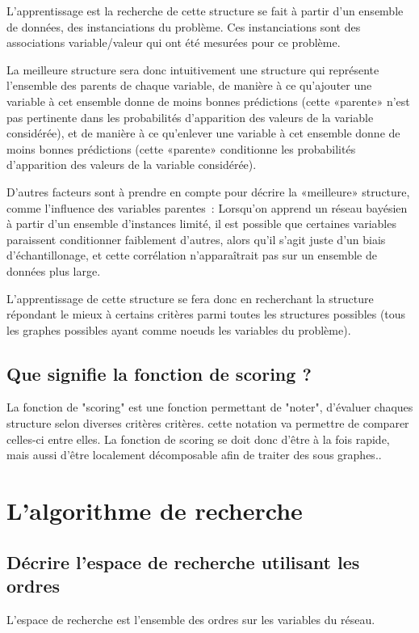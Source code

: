 \documentclass[french,a4paper]{article}
\begin{document}
L'apprentissage est la recherche de cette structure se fait à partir
d'un ensemble de données, des instanciations du problème. Ces
instanciations sont des associations variable/valeur qui ont été
mesurées pour ce problème.

La meilleure structure sera donc intuitivement une structure qui
représente l'ensemble des parents de chaque variable, de manière à ce
qu'ajouter une variable à cet ensemble donne de moins bonnes
prédictions (cette «parente» n'est pas pertinente dans les
probabilités d'apparition des valeurs de la variable considérée), et
de manière à ce qu'enlever une variable à cet ensemble donne de moins
bonnes prédictions (cette «parente» conditionne les probabilités
d'apparition des valeurs de la variable considérée).

D'autres facteurs sont à prendre en compte pour décrire la «meilleure»
structure, comme l'influence des variables parentes~: Lorsqu'on
apprend un réseau bayésien à partir d'un ensemble d'instances limité,
il est possible que certaines variables paraissent conditionner
faiblement d'autres, alors qu'il s'agit juste d'un biais
d'échantillonage, et cette corrélation n'apparaîtrait pas sur un
ensemble de données plus large.

L'apprentissage de cette structure se fera donc en recherchant la
structure répondant le mieux à certains critères parmi toutes les
structures possibles (tous les graphes possibles ayant comme noeuds
les variables du problème).

\subsection{Que signifie la fonction de scoring ?}
La fonction de "scoring" est une fonction permettant de "noter", d'évaluer
 chaques structure selon diverses critères critères. cette notation va permettre
 de comparer celles-ci entre elles.
La fonction de scoring se doit donc d'être à la fois rapide, mais aussi d'être
localement décomposable afin de traiter des sous graphes..

\section{L'algorithme de recherche}
\subsection{Décrire l'espace de recherche utilisant les ordres}
L'espace de recherche est l'ensemble des ordres sur les variables du
réseau.
\end{document}
